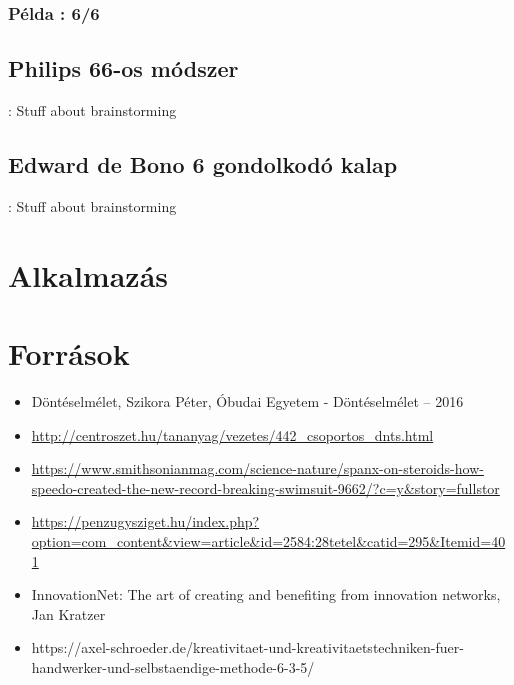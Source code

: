 \documentclass{beamer}
\begin{document}
\subsubsection{Példa : 6/6}
\begin{frame}
    
\end{frame}

\subsection{Philips 66-os módszer}
\begin{frame}{\secname : \subsecname}
    Stuff about brainstorming
\end{frame}

\subsection{Edward de Bono 6 gondolkodó kalap}
\begin{frame}{\secname : \subsecname}
    Stuff about brainstorming
\end{frame}

\section{Alkalmazás}


\section*{Források}
\begin{frame}{\secname}
    \begin{itemize}
        \item Döntéselmélet, Szikora Péter, Óbudai Egyetem - Döntéselmélet – 2016
        \item \url{http://centroszet.hu/tananyag/vezetes/442_csoportos_dnts.html}
        \item \url{https://www.smithsonianmag.com/science-nature/spanx-on-steroids-how-speedo-created-the-new-record-breaking-swimsuit-9662/?c=y&story=fullstor}
        \item \url{https://penzugysziget.hu/index.php?option=com_content&view=article&id=2584:28tetel&catid=295&Itemid=401}
        \item InnovationNet: The art of creating and benefiting from innovation networks, Jan Kratzer
        \item https://axel-schroeder.de/kreativitaet-und-kreativitaetstechniken-fuer-handwerker-und-selbstaendige-methode-6-3-5/
    \end{itemize}
\end{frame}
\end{document}
